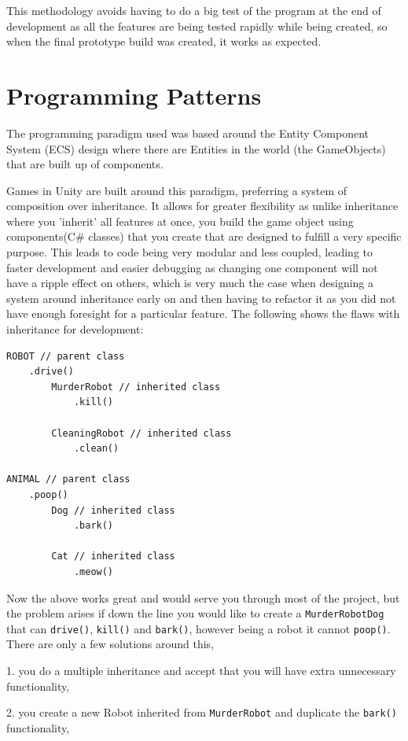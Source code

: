 \documentclass[11pt]{report}
\begin{document}
This methodology avoids having to do a big test of the program at the end of development as all the features are being tested rapidly while being created, so when the final prototype build was created, it works as expected.

\section{Programming Patterns}
The programming paradigm used was based around the Entity Component System (ECS) design where there are Entities in the world (the GameObjects) that are built up of components.

Games in Unity are built around this paradigm, preferring a system of composition over inheritance. It allows for greater flexibility as unlike inheritance where you 'inherit' all features at once, you build the game object using components(C\# classes) that you create that are designed to fulfill a very specific purpose. This leads to code being very modular and less coupled, leading to faster development and easier debugging as changing one component will not have a ripple effect on others, which is very much the case when designing a system around inheritance early on and then having to refactor it as you did not have enough foresight for a particular feature.
The following shows the flaws with inheritance for development\cite{CompOverInherit}:
\begin{lstlisting}
ROBOT // parent class
    .drive()
        MurderRobot // inherited class
            .kill()
        
        CleaningRobot // inherited class
            .clean()

ANIMAL // parent class
    .poop()
        Dog // inherited class
            .bark()

        Cat // inherited class
            .meow()
\end{lstlisting}
Now the above works great and would serve you through most of the project, but the problem arises if down the line you would like to create a \lstinline{MurderRobotDog} that can \lstinline{drive()}, \lstinline{kill()} and \lstinline{bark()}, however being a robot it cannot  \lstinline{poop()}. There are only a few solutions around this, 

1. you do a multiple inheritance and accept that you will have extra unnecessary functionality, 

2. you create a new Robot inherited from  \lstinline{MurderRobot} and duplicate the  \lstinline{bark()} functionality, 
\end{document}

